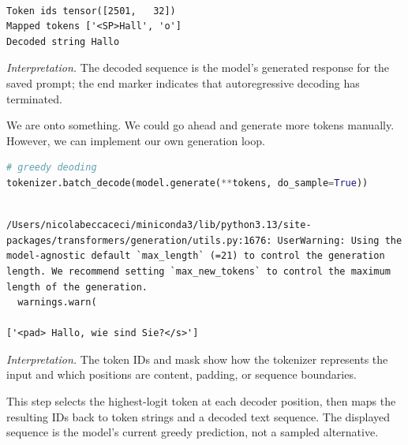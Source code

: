 \documentclass[../labs.tex]{subfiles}
\begin{document}
\begin{lstlisting}[basicstyle=\ttfamily\scriptsize,breaklines=true,breakatwhitespace=false,columns=fullflexible,keepspaces=true]

Token ids tensor([2501,   32])
Mapped tokens ['<SP>Hall', 'o']
Decoded string Hallo

\end{lstlisting}

\noindent\emph{Interpretation.} The decoded sequence is the model’s generated response for the saved prompt; the end marker indicates that autoregressive decoding has terminated.



\noindent We are onto something. We could go ahead and generate more tokens manually. However, we can implement our own generation loop.

\begin{lstlisting}[language=Python,basicstyle=\ttfamily\scriptsize,breaklines=true,breakatwhitespace=false,columns=fullflexible,keepspaces=true,numbers=none]
# greedy deoding
tokenizer.batch_decode(model.generate(**tokens, do_sample=True))
\end{lstlisting}

\hypertarget{res:lab02-text-01-t5-ipynb-83-e2e6e0f6e088}{}

\begin{lstlisting}[basicstyle=\ttfamily\scriptsize,breaklines=true,breakatwhitespace=false,columns=fullflexible,keepspaces=true]

/Users/nicolabeccaceci/miniconda3/lib/python3.13/site-packages/transformers/generation/utils.py:1676: UserWarning: Using the model-agnostic default `max_length` (=21) to control the generation length. We recommend setting `max_new_tokens` to control the maximum length of the generation.
  warnings.warn(

['<pad> Hallo, wie sind Sie?</s>']

\end{lstlisting}

\noindent\emph{Interpretation.} The token IDs and mask show how the tokenizer represents the input and which positions are content, padding, or sequence boundaries.



\noindent This step selects the highest-logit token at each decoder position, then maps the resulting IDs back to token strings and a decoded text sequence. The displayed sequence is the model’s current greedy prediction, not a sampled alternative.
\end{document}
